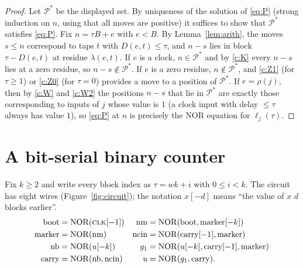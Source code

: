 \documentclass[11pt]{article}
\theoremstyle{definition}
\newcommand{\cP}{\mathcal{P}}
\newcommand{\NOR}{\operatorname{NOR}}
\begin{document}
\begin{proof}
Let $\cP^*$ be the displayed set.  By uniqueness of the solution of \eqref{eq:P} (strong induction
on $n$, using that all moves are positive) it suffices to show that $\cP^*$ satisfies \eqref{eq:P}.
Fix $n=\tau B+e$ with $e<B$.  By Lemma~\ref{lem:arith}, the moves $s\le n$ correspond to taps $t$ with
$D(e,t)\le\tau$, and $n-s$ lies in block $\tau-D(e,t)$ at residue $\lambda(e,t)$.
If $e$ is a clock, $n\in\cP^*$ and by \ref{c:K} every $n-s$ lies at a zero residue, so
$n-s\notin\cP^*$.  If $e$ is a zero residue, $n\notin\cP^*$, and \ref{c:Z1} (for $\tau\ge1$) or
\ref{c:Z0} (for $\tau=0$) provides a move to a position of $\cP^*$.  If $e=\rho(j)$, then by
\ref{c:W} and \ref{c:W2} the positions $n-s$ that lie in $\cP^*$ are exactly those corresponding to
inputs of $j$ whose value is $1$ (a clock input with delay $\le \tau$ always has value $1$), so
\eqref{eq:P} at $n$ is precisely the NOR equation for $\ell_j(\tau)$.
\end{proof}

\section{A bit-serial binary counter}\label{sec:counter}

Fix $k\ge 2$ and write every block index as $\tau=wk+i$ with $0\le i<k$.  The circuit has eight
wires (Figure~\ref{fig:circuit}); the notation $x[-d]$ means ``the value of $x$ $d$ blocks earlier''.
\begin{align*}
\mathrm{boot}&=\NOR(\textsc{clk}[-1]) & \mathrm{nm}&=\NOR(\mathrm{boot},\mathrm{marker}[-k])\\
\mathrm{marker}&=\NOR(\mathrm{nm}) & \mathrm{ncin}&=\NOR(\mathrm{carry}[-1],\mathrm{marker})\\
\mathrm{nb}&=\NOR(u[-k]) & g_1&=\NOR(u[-k],\mathrm{carry}[-1],\mathrm{marker})\\
\mathrm{carry}&=\NOR(\mathrm{nb},\mathrm{ncin}) & u&=\NOR(g_1,\mathrm{carry}).
\end{align*}
\end{document}

